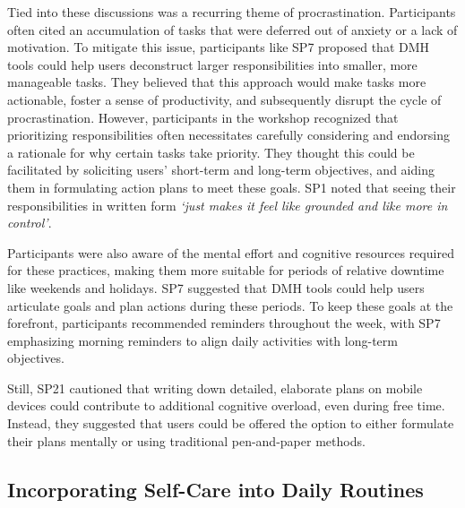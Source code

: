 Tied into these discussions was a recurring theme of procrastination. Participants often cited an accumulation of tasks that were deferred out of anxiety or a lack of motivation.
To mitigate this issue, participants like SP7 proposed that DMH tools could help users deconstruct larger responsibilities into smaller, more manageable tasks. They believed that this approach would make tasks more actionable, foster a sense of productivity, and subsequently disrupt the cycle of procrastination.
However, participants in the workshop recognized that prioritizing responsibilities often necessitates carefully considering and endorsing a rationale for why certain tasks take priority. They thought this could be facilitated by soliciting users' short-term and long-term objectives, and aiding them in formulating action plans to meet these goals. %
SP1 noted that seeing their responsibilities in written form \textit{`just makes it feel like grounded and like more in control'}.

Participants were also aware of the mental effort and cognitive resources required for these practices, making them more suitable for periods of relative downtime like weekends and holidays. SP7 suggested that DMH tools could help users articulate goals and plan actions during these periods. To keep these goals at the forefront, participants recommended reminders throughout the week, with SP7 emphasizing morning reminders to align daily activities with long-term objectives.

Still, SP21 cautioned that writing down detailed, elaborate plans on mobile devices could contribute to additional cognitive overload, even during free time. Instead, they suggested that users could be offered the option to either formulate their plans mentally or using traditional pen-and-paper methods.

\subsection{Incorporating Self-Care into Daily Routines}

